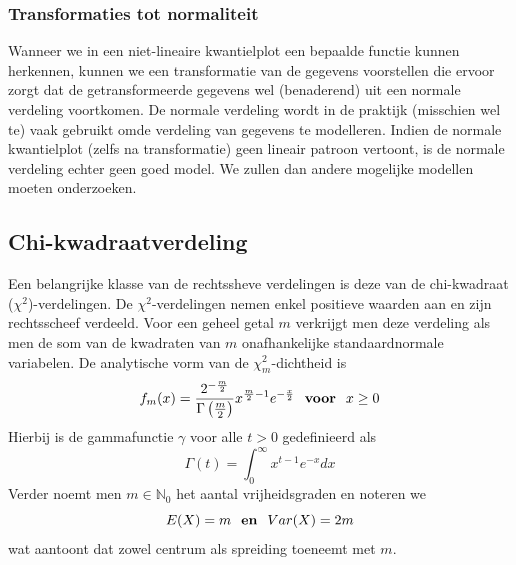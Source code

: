 \documentclass[titlepage]{article}
\numberwithin{equation}{section}
\begin{document}
\subsubsection{Transformaties tot normaliteit}
Wanneer we in een niet-lineaire kwantielplot een bepaalde functie kunnen herkennen, kunnen we een transformatie van de gegevens voorstellen die ervoor zorgt dat de getransformeerde gegevens wel (benaderend) uit een normale verdeling voortkomen.\newline\newline
\danger De normale verdeling wordt in de praktijk (misschien wel te) vaak gebruikt omde verdeling van gegevens te modelleren. Indien de normale kwantielplot (zelfs na transformatie) geen lineair patroon vertoont, is de normale verdeling echter geen goed model. We zullen dan andere mogelijke modellen moeten onderzoeken.
\subsection{Chi-kwadraatverdeling}
Een belangrijke klasse van de rechtssheve verdelingen is deze van de chi-kwadraat ($\chi^2$)-verdelingen.\newline\newline
De $\chi^2$-verdelingen nemen enkel positieve waarden aan en zijn rechtsscheef verdeeld. Voor een geheel getal $m$ verkrijgt men deze verdeling als men de som van de kwadraten van $m$ onafhankelijke standaardnormale variabelen. De analytische vorm van de $\chi^2_m$-dichtheid is
\begin{equation}
	f_m(x) = \frac{2^{-\frac{m}{2}}}{\Gamma\left(\frac{m}{2}\right)}x^{\frac{m}{2}-1}e^{-\frac{x}{2}} \text{ \textbf{ voor } } x \geq 0
	\label{4.28}
\end{equation}
Hierbij is de gammafunctie $\gamma$ voor alle $t>0$ gedefinieerd als
\begin{equation}
	\Gamma(t)=\int^\infty_0 x^{t-1}e^{-x}dx
	\label{4.29}
\end{equation}
Verder noemt men $m \in \mathbb{N}_0$ het aantal vrijheidsgraden en noteren we
\begin{equation}
	E(X) = m \text{ \textbf{ en } } Var(X) = 2m
	\label{4.30}
\end{equation}
wat aantoont dat zowel centrum als spreiding toeneemt met $m$.
\end{document}
